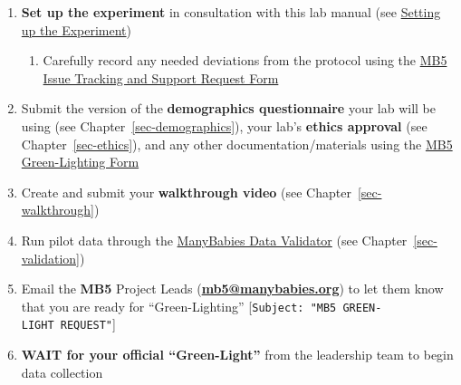 \documentclass[
  letterpaper,
  DIV=11,
  numbers=noendperiod,
  oneside]{scrreprt}
\providecommand{\tightlist}{%
  \setlength{\itemsep}{0pt}\setlength{\parskip}{0pt}}
\begin{document}
\begin{enumerate}
\def\labelenumi{(\arabic{enumi})}
\setcounter{enumi}{5}
\tightlist
\item
  \textbf{Set up the experiment} in consultation with this lab manual
  (see \hyperref[sec-setup]{Setting up the Experiment})

  \begin{enumerate}
  \def\labelenumii{\roman{enumii})}
  \tightlist
  \item
    Carefully record any needed deviations from the protocol using the
    \href{https://airtable.com/appRoqMKzcK3NsXt4/pagGafhoHcuVMs7ZV/form}{MB5
    Issue Tracking and Support Request Form}
  \end{enumerate}
\item
  Submit the version of the \textbf{demographics questionnaire} your lab
  will be using (see Chapter~\ref{sec-demographics}), your lab's
  \textbf{ethics approval} (see Chapter~\ref{sec-ethics}), and any other
  documentation/materials using the
  \href{https://airtable.com/appRoqMKzcK3NsXt4/pagPm3MXnFExsz1Ti/form}{MB5
  Green-Lighting Form}
\item
  Create and submit your \textbf{walkthrough video} (see
  Chapter~\ref{sec-walkthrough})
\item
  Run pilot data through the
  \href{https://manybabies.org/validator/}{ManyBabies Data Validator}
  (see Chapter~\ref{sec-validation})
\item
  Email the \textbf{MB5} Project Leads
  (\href{mailto:mb5@manybabies.org}{\textbf{mb5@manybabies.org}}) to let
  them know that you are ready for ``Green-Lighting''
  {[}\texttt{Subject:\ "MB5\ GREEN-LIGHT\ REQUEST"}{]}
\item
  \textbf{WAIT for your official ``Green-Light''} from the leadership
  team to begin data collection
\end{enumerate}

\begin{tcolorbox}[enhanced jigsaw, coltitle=black, colframe=quarto-callout-important-color-frame, titlerule=0mm, colback=white, arc=.35mm, toprule=.15mm, left=2mm, colbacktitle=quarto-callout-important-color!10!white, opacityback=0, bottomtitle=1mm, title=\textcolor{quarto-callout-important-color}{\faExclamation}\hspace{0.5em}{DO NOT BEGIN DATA COLLECTION (other than piloting) until your lab has
been explicitly given the ``Green-Light'' to do so by the Project Leads.}, breakable, rightrule=.15mm, opacitybacktitle=0.6, toptitle=1mm, leftrule=.75mm, bottomrule=.15mm]

\end{tcolorbox}
\end{document}
